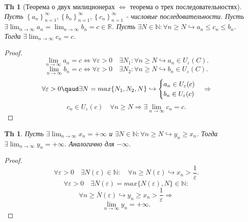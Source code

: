 \documentclass[a5paper, 10pt]{article}
\theoremstyle{plain}
\newtheorem{theorem}{Th}
\newtheorem*{theorem_}{Th}
\newcommand{\N}{\mathbb N}
\newcommand{\R}{\mathbb R}
\newcommand{\eps}{\varepsilon}
\newcommand{\hrarrow}{\hookrightarrow}
\newcommand{\Rarrow}{\Rightarrow}
\newcommand{\Lrarrow}{\Leftrightarrow}
\begin{document}
    \begin{theorem_}[Теорема о двух милиционерах $ \Lrarrow $ теорема о трех последовательностях]
        Пусть $
        \left\{a_n \right\}_{n = 1}^{\infty},
        \left\{b_n \right\}_{n = 1}^{\infty},
        \left\{c_n \right\}_{n = 1}^{\infty}
        $ - числовые последовательности.
        Пусть $
        \exists
        \lim_{n \to \infty} a_n =
        \lim_{n \to \infty} b_n =
        c \in \R
        $.
        Пусть $
        \exists N \in \N: \forall n \geq N \hrarrow
        a_n \leq c_n \leq b_n
        $.
        Тогда $ \exists \lim_{n \to \infty} c_n = c $.
    \end{theorem_}

    \begin{proof}
        \[
        \lim_{n \to \infty} a_n = c \Lrarrow
        \forall \eps > 0 \quad \exists N_1 : \forall n \geq N \hrarrow a_n \in U_{\eps}(C)
        .\]
        \[
        \lim_{n \to \infty} b_n = c \Lrarrow
        \forall \eps > 0 \quad \exists N_2 : \forall n \geq N \hrarrow b_n \in U_{\eps}(C)
        .\]
        \[
        \forall \eps > 0 \qaud \exists N = max \{ N_1, N_2, N \} \hrarrow
        \begin{cases}
            a_n \in U_{\eps}(c) \\
            b_n \in U_{\eps}(c) \\
        \end{cases}
        \Rarrow
        \]
        \[
        c_n \in U_{\eps}(c) \quad \forall n \geq N \Rarrow
        \exists \lim_{n \to \infty} c_n = c
        .\]
    \end{proof}

    \begin{theorem}
        Пусть $ \exists \lim_{n \to \infty} x_n = +\infty $ и
        $ \exists N \in \N: \forall n \geq N \hrarrow y_n \geq x_n $.
        Тогда $ \exists \lim_{n \to \infty} y_n = +\infty $.
        Аналогично для $ -\infty $.
    \end{theorem}

    \begin{proof}
        \[
        \forall \eps > 0 \quad \exists N(\eps) \in \N:
        \quad \forall n \geq N(\eps) \hrarrow x_n > \frac{1}{\eps}.
        \] \[
        \forall \eps > 0 \quad \exists  \overline{N}(\eps) = max \{ N(\eps), N \} \in \N:
        \] \[
        \forall n \geq \overline{N}(\eps) \hrarrow y_n \geq x_n > \frac{1}{\eps} \Rarrow
        \] \[
        \lim_{n \to \infty} y_n = +\infty.
        \]
    \end{proof}
\end{document}
